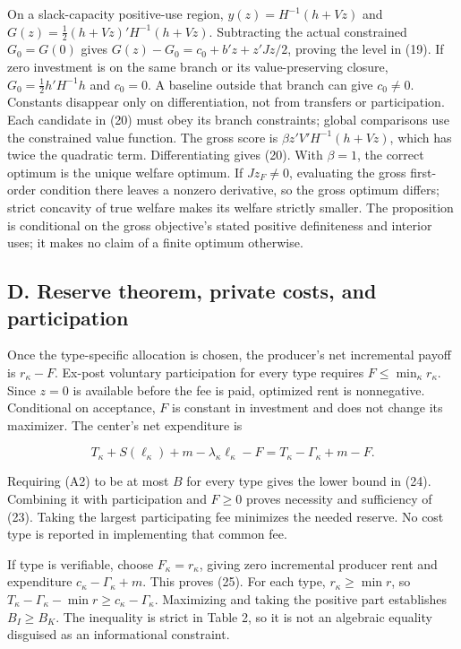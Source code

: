 \documentclass[
  11pt,
]{article}
\begin{document}
On a slack-capacity positive-use region, \(y(z)=H^{-1}(h+Vz)\) and
\(G(z)=\tfrac12(h+Vz)'H^{-1}(h+Vz)\). Subtracting the actual constrained
\(G_0=G(0)\) gives \(G(z)-G_0=c_0+b'z+z'Jz/2\), proving the level in
(19). If zero investment is on the same branch or its value-preserving
closure, \(G_0=\tfrac12h'H^{-1}h\) and \(c_0=0\). A baseline outside
that branch can give \(c_0\ne0\). Constants disappear only on
differentiation, not from transfers or participation. Each candidate in
(20) must obey its branch constraints; global comparisons use the
constrained value function. The gross score is
\(\beta z'V'H^{-1}(h+Vz)\), which has twice the quadratic term.
Differentiating gives (20). With \(\beta=1\), the correct optimum is the
unique welfare optimum. If \(Jz_F\ne0\), evaluating the gross
first-order condition there leaves a nonzero derivative, so the gross
optimum differs; strict concavity of true welfare makes its welfare
strictly smaller. The proposition is conditional on the gross
objective's stated positive definiteness and interior uses; it makes no
claim of a finite optimum otherwise.

\subsection{D. Reserve theorem, private costs, and
participation}\label{d.-reserve-theorem-private-costs-and-participation}

Once the type-specific allocation is chosen, the producer's net
incremental payoff is \(r_\kappa-F\). Ex-post voluntary participation
for every type requires \(F\leq\min_\kappa r_\kappa\). Since \(z=0\) is
available before the fee is paid, optimized rent is nonnegative.
Conditional on acceptance, \(F\) is constant in investment and does not
change its maximizer. The center's net expenditure is

\[T_\kappa+S(\ell_\kappa)+m-\lambda_\kappa\ell_\kappa-F
=T_\kappa-\Gamma_\kappa+m-F. \tag{A2}\]

Requiring (A2) to be at most \(B\) for every type gives the lower bound
in (24). Combining it with participation and \(F\geq0\) proves necessity
and sufficiency of (23). Taking the largest participating fee minimizes
the needed reserve. No cost type is reported in implementing that common
fee.

If type is verifiable, choose \(F_\kappa=r_\kappa\), giving zero
incremental producer rent and expenditure \(c_\kappa-\Gamma_\kappa+m\).
This proves (25). For each type, \(r_\kappa\geq\min r\), so
\(T_\kappa-\Gamma_\kappa-\min r\geq c_\kappa-\Gamma_\kappa\). Maximizing
and taking the positive part establishes \(B_I\geq B_K\). The inequality
is strict in Table 2, so it is not an algebraic equality disguised as an
informational constraint.
\end{document}
